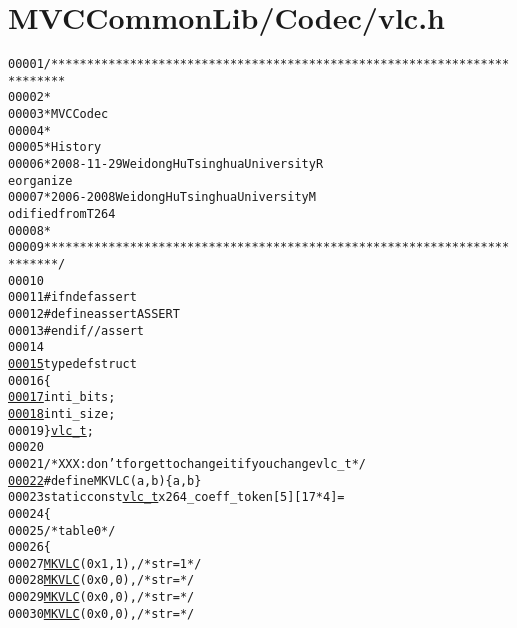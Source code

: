 \hypertarget{vlc_8h_source}{
\section{MVCCommonLib/Codec/vlc.h}
}


\begin{footnotesize}\begin{alltt}
00001 \textcolor{comment}{/************************************************************************}
00002 \textcolor{comment}{ *}
00003 \textcolor{comment}{ * MVC Codec}
00004 \textcolor{comment}{ * }
00005 \textcolor{comment}{ * History}
00006 \textcolor{comment}{ * 2008-11-29           Weidong Hu              Tsinghua University             R
      eorganize}
00007 \textcolor{comment}{ * 2006-2008            Weidong Hu              Tsinghua University             M
      odified from T264}
00008 \textcolor{comment}{ * }
00009 \textcolor{comment}{ ************************************************************************/}
00010 
00011 \textcolor{preprocessor}{#ifndef assert}
00012 \textcolor{preprocessor}{}\textcolor{preprocessor}{#define assert ASSERT}
00013 \textcolor{preprocessor}{}\textcolor{preprocessor}{#endif // assert}
00014 \textcolor{preprocessor}{}
\hypertarget{vlc_8h_source_l00015}{}\hyperlink{structvlc__t}{00015} \textcolor{keyword}{typedef} \textcolor{keyword}{struct}
00016 \{
\hypertarget{vlc_8h_source_l00017}{}\hyperlink{structvlc__t_af77d182a8c7102c14ec84be5b0f407c7}{00017}     \textcolor{keywordtype}{int} i\_bits;
\hypertarget{vlc_8h_source_l00018}{}\hyperlink{structvlc__t_a5f71a18991e1f971d2ffe3fd1272de77}{00018}     \textcolor{keywordtype}{int} i\_size;
00019 \} \hyperlink{structvlc__t}{vlc_t};
00020 
00021 \textcolor{comment}{/* XXX: don't forget to change it if you change vlc\_t */}
\hypertarget{vlc_8h_source_l00022}{}\hyperlink{vlc_8h_aa680b26539d09b5954221ff39a127faa}{00022} \textcolor{preprocessor}{#define MKVLC( a, b ) \{ a, b \}}
00023 \textcolor{preprocessor}{}\textcolor{keyword}{static} \textcolor{keyword}{const} \hyperlink{structvlc__t}{vlc_t} x264\_coeff\_token[5][17*4] =
00024 \{
00025     \textcolor{comment}{/* table 0 */}
00026     \{
00027         \hyperlink{vlc_8h_aa680b26539d09b5954221ff39a127faa}{MKVLC}( 0x1, 1 ), \textcolor{comment}{/* str=1 */}
00028         \hyperlink{vlc_8h_aa680b26539d09b5954221ff39a127faa}{MKVLC}( 0x0, 0 ), \textcolor{comment}{/* str= */}
00029         \hyperlink{vlc_8h_aa680b26539d09b5954221ff39a127faa}{MKVLC}( 0x0, 0 ), \textcolor{comment}{/* str= */}
00030         \hyperlink{vlc_8h_aa680b26539d09b5954221ff39a127faa}{MKVLC}( 0x0, 0 ), \textcolor{comment}{/* str= */}

\end{alltt}
\end{footnotesize}
